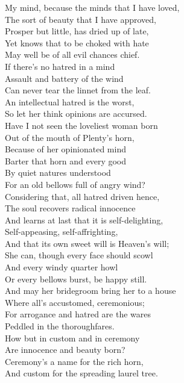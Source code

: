 \documentclass[a4,12pt]{article}
\begin{document}
\begin{center}
        \vspace{15pt}
        My mind, because the minds that I have loved,\\
        The sort of beauty that I have approved,\\
        Prosper but little, has dried up of late,\\
        Yet knows that to be choked with hate\\
        May well be of all evil chances chief.\\
        If there's no hatred in a mind\\
        Assault and battery of the wind\\
        Can never tear the linnet from the leaf.\\

        \vspace{15pt}
        An intellectual hatred is the worst,\\
        So let her think opinions are accursed.\\
        Have I not seen the loveliest woman born\\
        Out of the mouth of Plenty's horn,\\
        Because of her opinionated mind\\
        Barter that horn and every good\\
        By quiet natures understood\\
        For an old bellows full of angry wind?\\

        \vspace{15pt}
        Considering that, all hatred driven hence,\\
        The soul recovers radical innocence\\
        And learns at last that it is self-delighting,\\
        Self-appeasing, self-affrighting,\\
        And that its own sweet will is Heaven's will;\\
        She can, though every face should scowl\\
        And every windy quarter howl\\
        Or every bellows burst, be happy still.\\

        \vspace{15pt}
        And may her bridegroom bring her to a house\\
        Where all's accustomed, ceremonious;\\
        For arrogance and hatred are the wares\\
        Peddled in the thoroughfares.\\
        How but in custom and in ceremony\\
        Are innocence and beauty born?\\
        Ceremony's a name for the rich horn,\\
        And custom for the spreading laurel tree.\\
        


\end{center}
\end{document}
